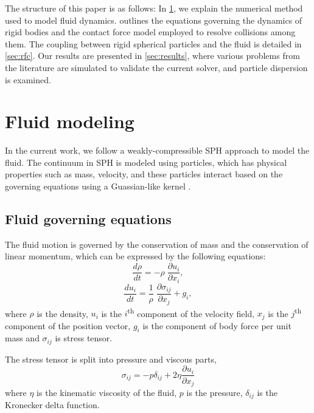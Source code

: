 \documentclass[preprint,12pt]{elsarticle}
\begin{document}
The structure of this paper is as follows: In
\cref{sec:fluid-modeling}, we explain the numerical method used to model fluid
dynamics.  outlines the equations governing the dynamics
of rigid bodies and the contact force model employed to resolve collisions
among them. The coupling between rigid spherical particles and the fluid is
detailed in \cref{sec:rfc}. Our results are presented in
\cref{sec:results}, where various problems from the literature are simulated to
validate the current solver, and particle dispersion is examined.



\FloatBarrier%
\section{Fluid modeling}
\label{sec:fluid-modeling}
In the current work, we follow a weakly-compressible SPH approach to model the
fluid. The continuum in SPH is modeled using particles, which has physical
properties such as mass, velocity, and these particles interact based on the
governing equations using a Guassian-like kernel
\cite{monaghan-review:2005,morris1997modeling}.


\FloatBarrier%
\subsection{Fluid governing equations}
\label{sec:fluid--governing-equations}
The fluid motion is governed by the conservation of mass and the conservation
of linear momentum, which can be expressed by the following equations:
\begin{equation}
  \label{eq:ce}
  \frac{d \rho}{d t} = - \rho \; \frac{\partial u_i}{\partial x_i},
\end{equation}
\begin{equation}
  \label{eq:me}
  \frac{d u_i}{d t} = \frac{1}{\rho} \; \frac{\partial \sigma_{ij}}{\partial x_j}
  + g_i,
\end{equation}
where $\rho$ is the density, $u_i$ is the $i$\textsuperscript{th} component of
the velocity field, $x_j$ is the $j$\textsuperscript{th} component of the
position vector, $g_i$ is the component of body force per unit mass and
$\sigma_{ij}$ is stress tensor.

The stress tensor is split into pressure and viscous parts,
\begin{equation}
  \label{eq:fluid-stress-decomposition}
  \sigma_{ij} = - p \delta_{ij} + 2 \eta \frac{\partial u_i}{\partial x_j}
\end{equation}
where $\eta$ is the kinematic viscosity of the fluid, $p$ is the pressure,
$\delta_{ij}$ is the Kronecker delta function.
\end{document}
